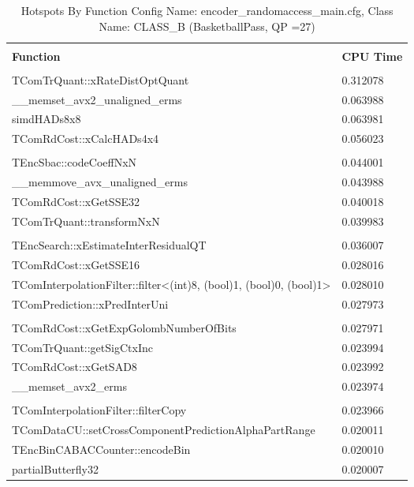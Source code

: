 \documentclass{article}%
\begin{document}
\begin{longtabu}{| X[l] | X[l] |}%
\caption{%
Hotspots By Function\newline%
 Config Name: encoder\_randomaccess\_main.cfg,\newline%
 Class Name: CLASS\_B\newline%
 (BasketballPass, QP =27)%
}%
\hline%
&\\%
\textbf{Function}&\textbf{CPU Time}\\%
&\\%
\hline%
\endhead%
TComTrQuant::xRateDistOptQuant&0.312078\\%
\hline%
\_\_memset\_avx2\_unaligned\_erms&0.063988\\%
\hline%
simdHADs8x8&0.063981\\%
\hline%
TComRdCost::xCalcHADs4x4&0.056023\\%
\hline%
&\\%
\hline%
TEncSbac::codeCoeffNxN&0.044001\\%
\hline%
\_\_memmove\_avx\_unaligned\_erms&0.043988\\%
\hline%
TComRdCost::xGetSSE32&0.040018\\%
\hline%
TComTrQuant::transformNxN&0.039983\\%
\hline%
&\\%
\hline%
TEncSearch::xEstimateInterResidualQT&0.036007\\%
\hline%
TComRdCost::xGetSSE16&0.028016\\%
\hline%
TComInterpolationFilter::filter<(int)8, (bool)1, (bool)0, (bool)1>&0.028010\\%
\hline%
TComPrediction::xPredInterUni&0.027973\\%
\hline%
&\\%
\hline%
TComRdCost::xGetExpGolombNumberOfBits&0.027971\\%
\hline%
TComTrQuant::getSigCtxInc&0.023994\\%
\hline%
TComRdCost::xGetSAD8&0.023992\\%
\hline%
\_\_memset\_avx2\_erms&0.023974\\%
\hline%
&\\%
\hline%
TComInterpolationFilter::filterCopy&0.023966\\%
\hline%
TComDataCU::setCrossComponentPredictionAlphaPartRange&0.020011\\%
\hline%
TEncBinCABACCounter::encodeBin&0.020010\\%
\hline%
partialButterfly32&0.020007\\%
\hline%
\end{longtabu}%
\end{document}
